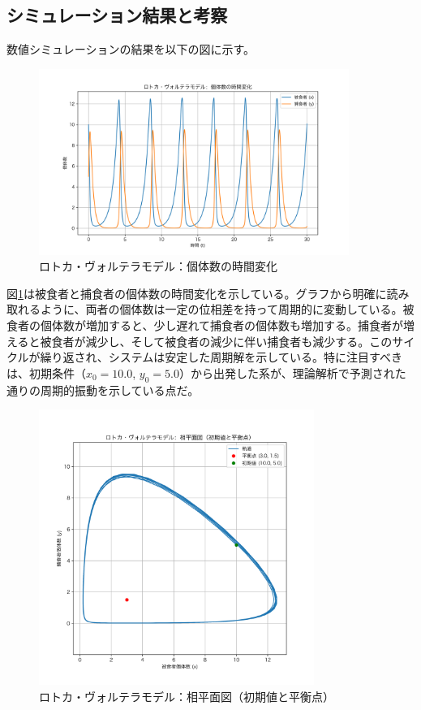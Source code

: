\documentclass{article}
\begin{document}
\subsection{シミュレーション結果と考察}

数値シミュレーションの結果を以下の図に示す。

\begin{figure}[htbp]
  \centering
  \includegraphics[width=0.9\textwidth]{time_series.png}
  \caption{ロトカ・ヴォルテラモデル：個体数の時間変化}
  \label{fig:time_series}
\end{figure}

図\ref{fig:time_series}は被食者と捕食者の個体数の時間変化を示している。グラフから明確に読み取れるように、両者の個体数は一定の位相差を持って周期的に変動している。被食者の個体数が増加すると、少し遅れて捕食者の個体数も増加する。捕食者が増えると被食者が減少し、そして被食者の減少に伴い捕食者も減少する。このサイクルが繰り返され、システムは安定した周期解を示している。特に注目すべきは、初期条件（$x_0=10.0$, $y_0=5.0$）から出発した系が、理論解析で予測された通りの周期的振動を示している点だ。

\begin{figure}[htbp]
  \centering
  \includegraphics[width=0.8\textwidth]{phase_plane_with_initial.png}
  \caption{ロトカ・ヴォルテラモデル：相平面図（初期値と平衡点）}
  \label{fig:phase_plane}
\end{figure}
\end{document}
